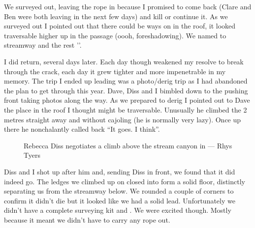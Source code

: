 We surveyed out, leaving the rope in because I promised to come back (Clare and Ben were both leaving in the next few days) and kill or continue it. As we surveyed out I pointed out that there could be ways on in the roof, it looked traversable higher up in the passage (oooh, foreshadowing). We named to streamway  and the rest ''.

 \begin{marginfigure}
\end{marginfigure}  

I did return, several days later. Each day though weakened my resolve to break through the crack, each day it grew tighter and more impenetrable in my memory. The trip I ended up leading was a photo/derig trip as I had abandoned the plan to get through this year. Dave, Diss and I bimbled down to the pushing front taking photos along the way. As we prepared to derig I pointed out to Dave the place in the roof I thought might be traversable. Unusually he climbed the 2 metres straight away and without cajoling (he is normally very lazy). Once up there he nonchalantly called back “It goes. I think”.
  \begin{figure}[t!]
\checkoddpage \ifoddpage \forcerectofloat \else \forceversofloat \fi
     \centering
        \caption{ Rebecca Diss negotiates a climb above the stream canyon in \protect{} ---  Rhys Tyers} \label{Diss Hallelujah}
\end{figure} 
 
Diss and I shot up after him and, sending Diss in front, we found that it did indeed go. The ledges we climbed up on closed into form a solid floor, distinctly separating us from the streamway below. We rounded a couple of corners to confirm it didn’t die but it looked like we had a solid lead. Unfortunately we didn’t have a complete surveying kit and . We were excited though. Mostly because it meant we didn’t have to carry any rope out.
 
